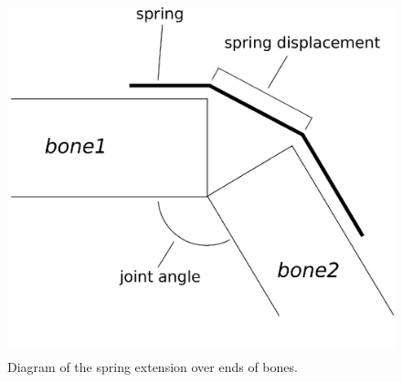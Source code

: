 \documentclass[landscape,26pt]{sciposter}
\begin{document}
\begin{minipage}[t]{14in}
		
	\vspace{0.3in}

	{\footnotesize
	
    \nocite{muscle_based_bipeds}
    \nocite{anim_human_athletics}
    \nocite{composable_controllers}
    \nocite{falling_landing}

    \begin{figure}
        \label{fig:bone_diag}
        \centering
        \includegraphics[height=4in]{diagrams/spring_angle_calc.eps}
        \caption{Diagram of the spring extension over ends of bones.}
    \end{figure}

	
	}
\end{minipage}
\end{document}
